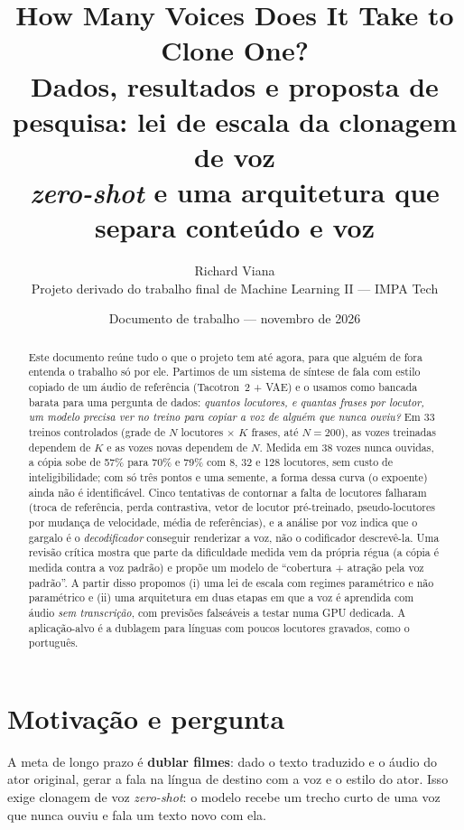 \documentclass[a4paper,11pt]{article}
\title{\vspace{-1.2cm}\textbf{How Many Voices Does It Take to Clone One?}\\[4pt]
\large Dados, resultados e proposta de pesquisa: lei de escala da clonagem de voz\\ \textit{zero-shot} e uma arquitetura que separa conteúdo e voz}
\author{Richard Viana\\[2pt]\small Projeto derivado do trabalho final de Machine Learning II --- IMPA Tech}
\date{\small Documento de trabalho --- novembro de 2026}
\begin{document}
\maketitle

\begin{abstract}
\noindent Este documento reúne tudo o que o projeto tem até agora, para que alguém de fora entenda o trabalho só por ele. Partimos de um sistema de síntese de fala com estilo copiado de um áudio de referência (Tacotron~2 + VAE) e o usamos como bancada barata para uma pergunta de dados: \emph{quantos locutores, e quantas frases por locutor, um modelo precisa ver no treino para copiar a voz de alguém que nunca ouviu?} Em 33 treinos controlados (grade de $N$ locutores $\times$ $K$ frases, até $N=200$), as vozes treinadas dependem de $K$ e as vozes novas dependem de $N$. Medida em 38 vozes nunca ouvidas, a cópia sobe de 57\% para 70\% e 79\% com 8, 32 e 128 locutores, sem custo de inteligibilidade; com só três pontos e uma semente, a forma dessa curva (o expoente) ainda não é identificável. Cinco tentativas de contornar a falta de locutores falharam (troca de referência, perda contrastiva, vetor de locutor pré-treinado, pseudo-locutores por mudança de velocidade, média de referências), e a análise por voz indica que o gargalo é o \emph{decodificador} conseguir renderizar a voz, não o codificador descrevê-la. Uma revisão crítica mostra que parte da dificuldade medida vem da própria régua (a cópia é medida contra a voz padrão) e propõe um modelo de ``cobertura + atração pela voz padrão''. A partir disso propomos (i) uma lei de escala com regimes paramétrico e não paramétrico e (ii) uma arquitetura em duas etapas em que a voz é aprendida com áudio \emph{sem transcrição}, com previsões falseáveis a testar numa GPU dedicada. A aplicação-alvo é a dublagem para línguas com poucos locutores gravados, como o português.
\end{abstract}

\tableofcontents
\newpage

\section{Motivação e pergunta}

A meta de longo prazo é \textbf{dublar filmes}: dado o texto traduzido e o áudio do ator original, gerar a fala na língua de destino com a voz e o estilo do ator. Isso exige clonagem de voz \emph{zero-shot}: o modelo recebe um trecho curto de uma voz que nunca ouviu e fala um texto novo com ela.
\end{document}
